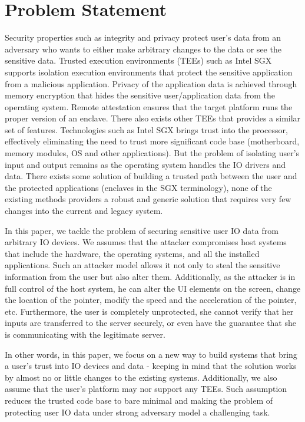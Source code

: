 \section{Problem Statement}
\label{sec:problemStatement}

Security properties such as integrity and privacy protect user's data from an adversary who wants to either make arbitrary changes to the data or see the sensitive data. Trusted execution environments (TEEs) such as Intel SGX supports isolation execution environments that protect the sensitive application from a malicious application. Privacy of the application data is achieved through memory encryption that hides the sensitive user/application data from the operating system. Remote attestation ensures that the target platform runs the proper version of an enclave. There also exists other TEEs that provides a similar set of features. Technologies such as Intel SGX brings trust into the processor, effectively eliminating the need to trust more significant code base (motherboard, memory modules, OS and other applications). But the problem of isolating user's input and output remains as the operating system handles the IO drivers and data. There exists some solution of building a trusted path between the user and the protected applications (enclaves in the SGX terminology), none of the existing methods providers a robust and generic solution that requires very few changes into the current and legacy system.

In this paper, we tackle the problem of securing sensitive user IO data from arbitrary IO devices. We assumes that the attacker compromises host systems that include the hardware, the operating systems, and all the installed applications. Such an attacker model allows it not only to steal the sensitive information from the user but also alter them. Additionally, as the attacker is in full control of the host system, he can alter the UI elements on the screen, change the location of the pointer, modify the speed and the acceleration of the pointer, etc. Furthermore, the user is completely unprotected, she cannot verify that her inputs are transferred to the server securely, or even have the guarantee that she is communicating with the legitimate server. 

In other words, in this paper, we focus on a new way to build systems that bring a user's trust into IO devices and data - keeping in mind that the solution works by almost no or little changes to the existing systems. Additionally, we also assume that the user's platform may nor support any TEEs. Such assumption reduces the trusted code base to bare minimal and making the problem of protecting user IO data under strong adversary model a challenging task.      


